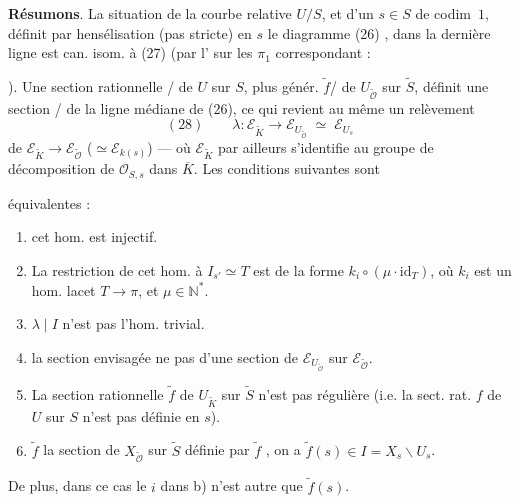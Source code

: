 \documentclass[11pt,a4paper]{article}
\begin{document}
\textbf{Résumons}. La situation de la courbe relative $U/S$, et d'un
$s \in S$ de codim~$1$, définit par hensélisation (pas stricte) en $s$ le
diagramme (26) , dans la dernière ligne est can. isom. à (27)
(par l' \struck{\ill{}} sur les $\pi_1$ correspondant :


). Une section rationnelle / de $U$ sur $S$, plus génér.
$\tilde{f}$/ de $U_{\tilde{\mathcal{O}}}$ sur $\tilde{S}$, définit une
section / de la ligne médiane de (26), ce qui
revient au même un relèvement
\[
  (28)\qquad \lambda \colon \mathcal{E}_{\tilde{K}} \longrightarrow \mathcal{E}_{U_{\tilde{\mathcal{O}}}} \;\simeq\; \mathcal{E}_{U_s}
\]
de $\mathcal{E}_{\tilde{K}} \to \mathcal{E}_{\tilde{\mathcal{O}}}$
($\simeq \mathcal{E}_{k(s)}$) — où $\mathcal{E}_{\tilde{K}}$ par ailleurs
s'identifie au groupe de décomposition de $\mathcal{O}_{S,s}$ dans
$\overline{K}$. Les conditions suivantes sont

équivalentes :
\begin{enumerate}
  \item[a)] cet hom. est injectif.
  \item[b)] La restriction de cet hom. à $I_{s'} \simeq T$ est de la forme
  $k_i \circ (\mu \cdot \mathrm{id}_T)$, où $k_i$ est un hom. lacet
  $T \to \pi$, et $\mu \in \mathbb{N}^{*}$.
  \item[c)] $\lambda \mid I$ n'est pas l'hom. trivial.
  \item[d)] la section envisagée  ne
  \struck{\ill{}}  pas d'une section de
  $\mathcal{E}_{U_{\tilde{\mathcal{O}}}}$ sur $\mathcal{E}_{\tilde{\mathcal{O}}}$.
  \item[e)] La section rationnelle  $\tilde{f}$ de
  $U_{\tilde{K}}$ sur $\tilde{S}$ n'est pas régulière (i.e. la sect. rat. $f$
  de $U$ sur $S$ n'est pas définie en $s$).
  \item[f)]   $\tilde{f}$  la section de $X_{\tilde{\mathcal{O}}}$ sur $\tilde{S}$ définie par
  $\tilde{f}$ \struck{\ill{}} \add{\ill{}}, on a
  $\tilde{f}(s) \in I = X_s \smallsetminus U_s$.
\end{enumerate}
De plus, dans ce cas le $i$ dans b) n'est autre que $\tilde{f}(s)$.
\end{document}
